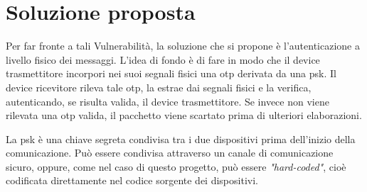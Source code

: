 \section{Soluzione proposta}

Per far fronte a tali Vulnerabilità, la soluzione che si propone è l'autenticazione a livello fisico dei messaggi. L'idea di fondo è di fare in modo che il device trasmettitore incorpori nei suoi segnali fisici una \gls{otp} derivata da una \gls{psk}. Il device ricevitore rileva tale \gls{otp}, la estrae dai segnali fisici e la verifica, autenticando, se risulta valida, il device trasmettitore. Se invece non viene rilevata una \gls{otp} valida, il pacchetto viene scartato prima di ulteriori elaborazioni.

La \gls{psk} è una chiave segreta condivisa tra i due dispositivi prima dell'inizio della comunicazione. Può essere condivisa attraverso un canale di comunicazione sicuro, oppure, come nel caso di questo progetto, può essere \textit{"hard-coded"}, cioè codificata direttamente nel codice sorgente dei dispositivi.



